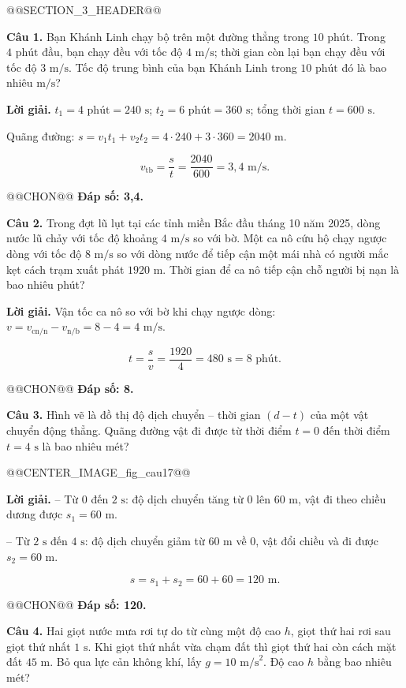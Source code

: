 \documentclass{article}
\begin{document}
@@SECTION_3_HEADER@@

\textbf{Câu 1.} Bạn Khánh Linh chạy bộ trên một đường thẳng trong $10\text{ phút}$. Trong $4\text{ phút}$ đầu, bạn chạy đều với tốc độ $4\text{ m/s}$; thời gian còn lại bạn chạy đều với tốc độ $3\text{ m/s}$. Tốc độ trung bình của bạn Khánh Linh trong $10\text{ phút}$ đó là bao nhiêu $\text{m/s}$?

\textbf{Lời giải.} $t_1 = 4\text{ phút} = 240\text{ s}$; $t_2 = 6\text{ phút} = 360\text{ s}$; tổng thời gian $t = 600\text{ s}$.

Quãng đường: $s = v_1t_1 + v_2t_2 = 4 \cdot 240 + 3 \cdot 360 = 2040\text{ m}$.

\[v_{\text{tb}} = \frac{s}{t} = \frac{2040}{600} = 3{,}4\text{ m/s}.\]

@@CHON@@ \textbf{Đáp số: 3,4.}

\textbf{Câu 2.} Trong đợt lũ lụt tại các tỉnh miền Bắc đầu tháng 10 năm 2025, dòng nước lũ chảy với tốc độ khoảng $4\text{ m/s}$ so với bờ. Một ca nô cứu hộ chạy ngược dòng với tốc độ $8\text{ m/s}$ so với dòng nước để tiếp cận một mái nhà có người mắc kẹt cách trạm xuất phát $1920\text{ m}$. Thời gian để ca nô tiếp cận chỗ người bị nạn là bao nhiêu phút?

\textbf{Lời giải.} Vận tốc ca nô so với bờ khi chạy ngược dòng: $v = v_{\text{cn/n}} - v_{\text{n/b}} = 8 - 4 = 4\text{ m/s}$.

\[t = \frac{s}{v} = \frac{1920}{4} = 480\text{ s} = 8\text{ phút}.\]

@@CHON@@ \textbf{Đáp số: 8.}

\textbf{Câu 3.} Hình vẽ là đồ thị độ dịch chuyển -- thời gian $(d - t)$ của một vật chuyển động thẳng. Quãng đường vật đi được từ thời điểm $t = 0$ đến thời điểm $t = 4\text{ s}$ là bao nhiêu mét?

@@CENTER_IMAGE_fig_cau17@@

\textbf{Lời giải.} -- Từ $0$ đến $2\text{ s}$: độ dịch chuyển tăng từ $0$ lên $60\text{ m}$, vật đi theo chiều dương được $s_1 = 60\text{ m}$.

-- Từ $2\text{ s}$ đến $4\text{ s}$: độ dịch chuyển giảm từ $60\text{ m}$ về $0$, vật đổi chiều và đi được $s_2 = 60\text{ m}$.

\[s = s_1 + s_2 = 60 + 60 = 120\text{ m}.\]

@@CHON@@ \textbf{Đáp số: 120.}

\textbf{Câu 4.} Hai giọt nước mưa rơi tự do từ cùng một độ cao $h$, giọt thứ hai rơi sau giọt thứ nhất $1\text{ s}$. Khi giọt thứ nhất vừa chạm đất thì giọt thứ hai còn cách mặt đất $45\text{ m}$. Bỏ qua lực cản không khí, lấy $g = 10\text{ m/s}^2$. Độ cao $h$ bằng bao nhiêu mét?
\end{document}
